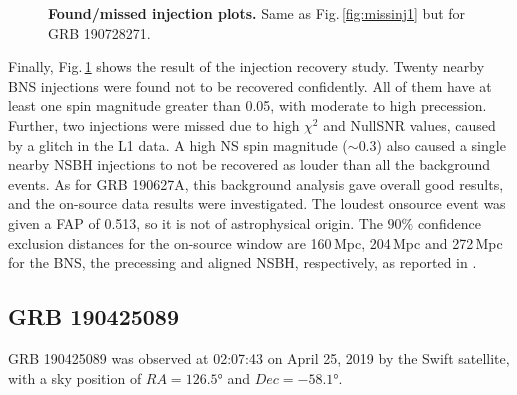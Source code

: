 \documentclass[binding=0.6cm, LaM]{sapthesis}
\begin{document}
        \begin{figure}[!t]
          \noindent
          \label{missinj2_3}
          \centering
          \caption{\textbf{Found/missed injection plots.} Same as Fig.\,\ref{fig:missinj1} but for GRB 190728271.}
          \label{fig:missinj2_3}
        \end{figure}

        Finally, Fig.\,\ref{fig:missinj2_3} shows the result of the injection recovery study.  Twenty nearby BNS injections were found not to be recovered confidently.
        All of them have at least one spin magnitude greater than 0.05, with moderate to high precession. 
	Further, two injections were missed due to high $\chi^2$ and NullSNR values, caused by a glitch in the L1 data.
	A high NS spin magnitude ($\sim 0.3$) also caused a single nearby NSBH injections to not be recovered as louder than all the background events.
        As for GRB 190627A, this background analysis gave overall good results,
	and the on-source data results were investigated.
	The loudest onsource event was given a FAP of 0.513, so it is not of astrophysical origin.  The $90\%$ confidence exclusion distances for the on-source window are 160\,Mpc, 204\,Mpc and 272\,Mpc for the BNS, the precessing and aligned NSBH, respectively, as reported in \cite{43}.

\subsection{GRB 190425089}
        GRB 190425089 was observed at 02:07:43 on April 25, 2019 by the Swift satellite,
        with a sky position of $RA=\ang{126.5}$ and $Dec=\ang{-58.1}$.
\end{document}
